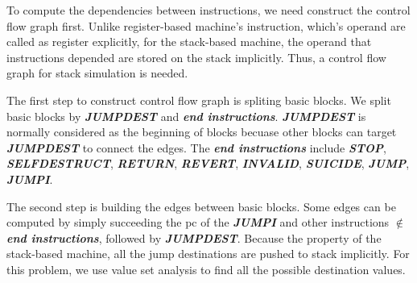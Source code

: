 \documentclass{article}
\begin{document}
To compute the dependencies between instructions, we need construct the control flow graph first. Unlike register-based machine's instruction, which's operand are called as register explicitly, for the stack-based machine, the operand that instructions depended are stored on the stack implicitly. Thus, a control flow graph for stack simulation is needed.


The first step to construct control flow graph is spliting basic blocks. We split basic blocks by \textbf{\textit{JUMPDEST}} and \textbf{\textit{end instructions}}. \textbf{\textit{JUMPDEST}} is normally considered as the beginning of blocks becuase other blocks can target \textbf{\textit{JUMPDEST}} to connect the edges. The \textbf{\textit{end instructions}} include \textbf{\textit{STOP}}, \textbf{\textit{SELFDESTRUCT}}, \textbf{\textit{RETURN}}, \textbf{\textit{REVERT}}, \textbf{\textit{INVALID}}, \textbf{\textit{SUICIDE}}, \textbf{\textit{JUMP}}, \textbf{\textit{JUMPI}}.

The second step is building the edges between basic blocks. Some edges can be computed by simply succeeding the pc of the \textbf{\textit{JUMPI}} and other instructions $\notin$ \textbf{\textit{end instructions}}, followed by \textbf{\textit{JUMPDEST}}. Because the property of the stack-based machine, all the jump destinations are pushed to stack implicitly. For this problem, we use value set analysis to find all the possible destination values.
\end{document}
